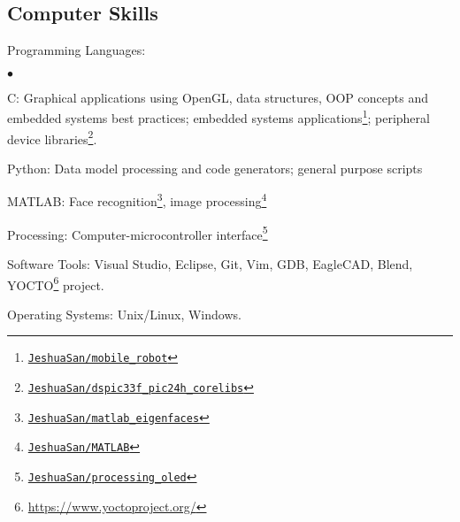 \documentclass[margin,line]{res}
\newenvironment{list1}{
  \begin{list}{\ding{113}}{%
      \setlength{\itemsep}{0in}
      \setlength{\parsep}{0in} \setlength{\parskip}{0in}
      \setlength{\topsep}{0in} \setlength{\partopsep}{0in} 
      \setlength{\leftmargin}{0.17in}}}{\end{list}}
\newenvironment{list2}{
  \begin{list}{$\bullet$}{%
      \setlength{\itemsep}{0in}
      \setlength{\parsep}{0in} \setlength{\parskip}{0in}
      \setlength{\topsep}{0in} \setlength{\partopsep}{0in} 
      \setlength{\leftmargin}{0.2in}}}{\end{list}}
\begin{document}
\begin{resume}
\section{\sc Computer Skills} 
\begin{list1}
\item[] Programming Languages:
\begin{list2}
\item C:
    Graphical applications using OpenGL, data structures, OOP concepts and embedded systems best practices;
    embedded systems applications\footnote{\faGithub \href{https://github.com/JeshuaSan/mobile_robot}{\texttt{JeshuaSan/mobile\_robot}}};
    peripheral device libraries\footnote{\faGithub \href{https://github.com/JeshuaSan/dspic33f_pic24h_corelibs}{\texttt{JeshuaSan/dspic33f\_pic24h\_corelibs}}}.
\item Python: Data model processing and code generators; general purpose scripts
\item MATLAB:
    Face recognition\footnote{\faGithub\href{https://github.com/JeshuaSan/matlab\_eigenfaces}{\texttt{JeshuaSan/matlab\_eigenfaces}}},
    image processing\footnote{\faGithub\href{https://github.com/JeshuaSan/MATLAB}{\texttt{JeshuaSan/MATLAB}}}
\item Processing:
    Computer-microcontroller interface\footnote{\faGithub\href{https://github.com/JeshuaSan/processing_oled}{\texttt{JeshuaSan/processing\_oled}}}
\end{list2}
\item[] Software Tools: Visual Studio, Eclipse, Git, Vim, GDB, EagleCAD, Blend, YOCTO\footnote{\href{https://www.yoctoproject.org/}
{https://www.yoctoproject.org/}} project.
\item[] Operating Systems:  Unix/Linux, Windows.
\end{list1}


\end{resume}
\end{document}
